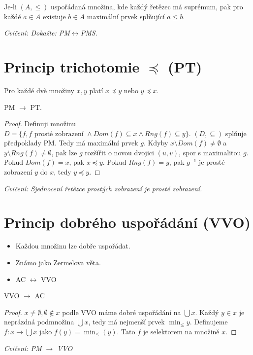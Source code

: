 Je-li $(A, \leq)$ uspořádaná množina, kde každý řetězec má suprémum, pak pro každé $a \in A$ existuje $b \in A$ maximální prvek splňující $a \leq b$.

\textit{Cvičení: Dokažte: PM$\leftrightarrow$PMS.}

\section{Princip trichotomie $\preceq$ (PT)}

Pro každé dvě množiny $x,y$ platí $x \preceq y$ nebo $y \preceq x$.

\begin{lemma}
	PM $\rightarrow$ PT.
\end{lemma}

\begin{proof}
	Definuji množinu $D = \{f, f \text{ prosté zobrazení } \land Dom(f) \subseteq x \land Rng(f) \subseteq y \}$. $(D, \subseteq)$ splňuje předpoklady PM. Tedy má maximální prvek $g$. Kdyby $x \setminus Dom(f) \neq \emptyset$ a $y \setminus Rng(f) \neq \emptyset$, pak lze $g$ rozšířit o novou dvojici $(u,v)$, spor s maximalitou $g$. Pokud $Dom(f) = x$, pak $x \preceq y$. Pokud $Rng(f) = y$, pak $g^{-1}$ je prosté zobrazení $y$ do $x$, tedy $y \preceq y$.
\end{proof}

\textit{Cvičení: Sjednocení řetězce prostých zobrazení je prosté zobrazení.}

\section{Princip dobrého uspořádání (VVO)}

\begin{itemize}
	\item Každou množinu lze dobře uspořádat.
	\item Známo jako Zermelova věta.
	\item AC $\leftrightarrow$ VVO
\end{itemize}

\begin{lemma}
	VVO $\rightarrow$ AC
\end{lemma}

\begin{proof}
	$x \neq \emptyset, \emptyset \notin x$ podle VVO máme dobré uspořádání na $\bigcup x$. Každý $y \in x$ je neprázdná podmnožina $\bigcup x$, tedy má nejmenší prvek $\min_{\leq}y$. Definujeme $f: x \to \bigcup x$ jako $f(y) = \min_{\leq}(y)$. Tato $f$ je selektorem na množině $x$.
\end{proof}

\textit{Cvičení: PM $\rightarrow$ VVO}